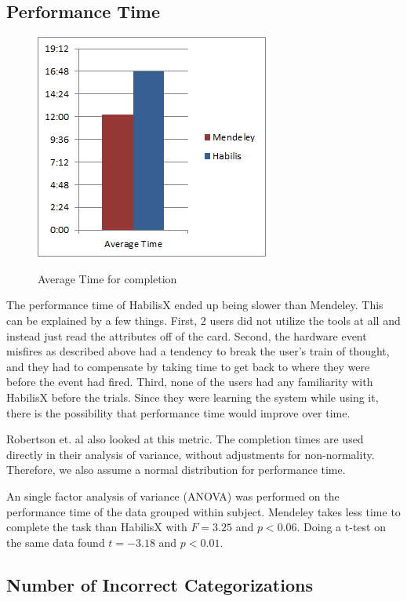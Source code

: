 \documentclass{article}
\begin{document}
\subsection*{Performance Time}


\begin{figure}[b!]
\centering
\scalebox{1}
{\includegraphics{AverageTime.png}}
\caption{Average Time for completion}
\label{Fig:timeChart}
\end{figure}

The performance time of HabilisX ended up being slower than Mendeley.  This can be explained by a few things.  First, 2 users did not utilize the tools at all and instead just read the attributes off of the card.  Second, the hardware event misfires as described above had a tendency to break the user's train of thought, and they had to compensate by taking time to get back to where they were before the event had fired.  Third, none of the users had any familiarity with HabilisX before the trials.  Since they were learning the system while using it, there is the possibility that performance time would improve over time. 


Robertson et. al  \cite{Robertson1998} also looked at this metric.  The completion times are used directly in their analysis of variance, without adjustments for non-normality.  Therefore, we also assume a normal distribution for performance time.


An single factor analysis of variance (ANOVA) was performed on the performance time of the data grouped within subject. Mendeley takes less time to complete the task than HabilisX with $F=3.25$ and $p < 0.06$.  Doing a t-test on the same data found $t=-3.18$ and $p<0.01$. 




\subsection*{Number of Incorrect Categorizations}
\end{document}
